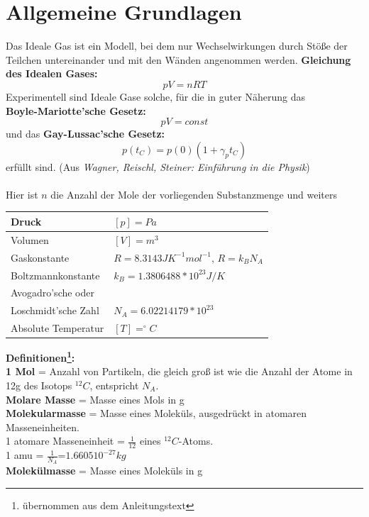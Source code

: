 \documentclass{article}
\begin{document}
\section{Allgemeine Grundlagen}
Das Ideale Gas ist ein Modell, bei dem nur Wechselwirkungen durch Stöße der Teilchen untereinander und mit den Wänden angenommen werden.
\textbf{Gleichung des Idealen Gases:}
\begin{equation}
\label{gasgleichung}
pV=nRT
\end{equation}
Experimentell sind Ideale Gase solche, für die in guter Näherung das\\ \textbf{Boyle-Mariotte'sche Gesetz:}
\begin{equation}
\label{boyle-mariotte}
pV=const
\end{equation}
und das \textbf{Gay-Lussac'sche Gesetz:}
\begin{equation}
\label{gay-lussac}
p(t_C)=p(0)(1+\gamma_p t_C)
\end{equation}
erfüllt sind. (Aus \textit{Wagner, Reischl, Steiner: Einführung in die Physik})\\
\\
Hier ist $n$ die Anzahl der Mole der vorliegenden Substanzmenge und weiters
\begin{flushleft}
\begin{tabular}{|l|l|}
\hline Druck & $[p]=Pa$\\
\hline Volumen & $[V]=m^3$\\
\hline Gaskonstante & $R=8.3143 J K^{-1} mol^{-1}$, $R=k_B N_A$\\
\hline Boltzmannkonstante & $k_B=1.3806488*10^{23}J/K$\\
\hline Avogadro'sche oder &\\
Loschmidt'sche Zahl & $N_A=6.02214179*10^{23}$\\
\hline Absolute Temperatur & $[T]=^\circ C$\\
\hline
\end{tabular}
\end{flushleft}
\textbf{Definitionen\footnote{übernommen aus dem Anleitungstext}:}\\
\textbf{1 Mol} = Anzahl von Partikeln, die gleich groß ist wie die Anzahl der Atome in 12g des Isotops $^{12}C$, entspricht $N_A$. \\
\textbf{Molare Masse} = Masse eines Mols in g\\
\textbf{Molekularmasse} = Masse eines Moleküls, ausgedrückt in atomaren Masseneinheiten. \\
1 atomare Masseneinheit = $\frac{1}{12}$ eines $^{12}C$-Atoms.\\
1 amu = $\frac{1}{N_A}$=$1.6605 10^{-27}kg$\\
\textbf{Molekülmasse} = Masse eines Moleküls in g\\
\newpage
\end{document}
